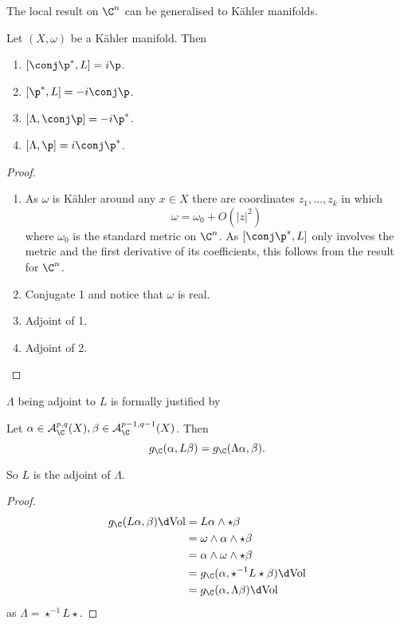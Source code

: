 \documentclass[a4paper]{article}
\newcommand{\w}{\wedge} %
\begin{document}
The local result on \(\C^n\) can be generalised to Kähler manifolds.

\begin{theorem}
  Let \((X, \omega)\) be a Kähler manifold. Then
  \begin{enumerate}
  \item \([\conj \p^*, L] = i \p\).
  \item \([\p^*, L] = -i \conj \p\).
  \item \([\Lambda, \conj \p] = - i \p^*\).
  \item \([\Lambda, \p] = i\conj \p^*\).
\end{enumerate}
\end{theorem}

\begin{proof}\leavevmode
  \begin{enumerate}
  \item As \(\omega\) is Kähler around any \(x \in X\) there are coordinates \(z_1, \dots, z_k\) in which
    \[
      \omega = \omega_0 + O(|z|^2)
    \]
    where \(\omega_0\) is the standard metric on \(\C^n\). As \([\conj \p^*, L]\) only involves the metric and the first derivative of its coefficients, this follows from the result for \(\C^n\).
  \item Conjugate 1 and notice that \(\omega\) is real.
  \item Adjoint of 1.
  \item Adjoint of 2.
  \end{enumerate}
\end{proof}

\(\Lambda\) being adjoint to \(L\) is formally justified by

\begin{lemma}
  Let \(\alpha \in \mathcal A_\C^{p, q}(X), \beta \in \mathcal A_\C^{p - 1, q - 1}(X)\). Then
  \[
    g_\C(\alpha, L\beta) = g_\C(\Lambda \alpha, \beta).
  \]
\end{lemma}
So \(L\) is the adjoint of \(\Lambda\).

\begin{proof}
  \begin{align*}
    g_\C(L\alpha, \beta) \d \text{Vol}
    &= L\alpha \w \star \beta \\
    &= \omega \w \alpha \w \star \beta \\
    &= \alpha \w \omega \w \star \beta \\
    &= g_\C(\alpha, \star^{-1} L \star \beta) \d \text{Vol} \\
    &= g_\C(\alpha, \Lambda \beta) \d \text{Vol}
  \end{align*}
  as \(\Lambda = \star^{-1} L \star\).
\end{proof}
\end{document}
